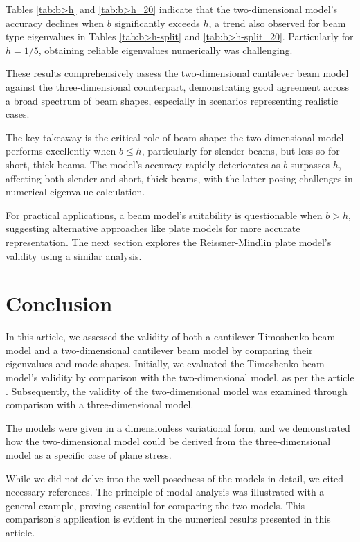 Tables \ref{tab:b>h} and \ref{tab:b>h_20} indicate that the two-dimensional model's accuracy declines when $b$ significantly exceeds $h$, a trend also observed for beam type eigenvalues in Tables \ref{tab:b>h-split} and \ref{tab:b>h-split_20}. Particularly for $h=1/5$, obtaining reliable eigenvalues numerically was challenging.

These results comprehensively assess the two-dimensional cantilever beam model against the three-dimensional counterpart, demonstrating good agreement across a broad spectrum of beam shapes, especially in scenarios representing realistic cases.

The key takeaway is the critical role of beam shape: the two-dimensional model performs excellently when $b \leq h$, particularly for slender beams, but less so for short, thick beams. The model's accuracy rapidly deteriorates as $b$ surpasses $h$, affecting both slender and short, thick beams, with the latter posing challenges in numerical eigenvalue calculation.

For practical applications, a beam model's suitability is questionable when $b > h$, suggesting alternative approaches like plate models for more accurate representation. The next section explores the Reissner-Mindlin plate model's validity using a similar analysis.

\section{Conclusion} \label{sec:conclusion}
In this article, we assessed the validity of both a cantilever Timoshenko beam model and a two-dimensional cantilever beam model by comparing their eigenvalues and mode shapes. Initially, we evaluated the Timoshenko beam model's validity by comparison with the two-dimensional model, as per the article \cite{LVV09}. Subsequently, the validity of the two-dimensional model was examined through comparison with a three-dimensional model.

The models were given in a dimensionless variational form, and we demonstrated how the two-dimensional model could be derived from the three-dimensional model as a specific case of plane stress.

While we did not delve into the well-posedness of the models in detail, we cited necessary references. The principle of modal analysis was illustrated with a general example, proving essential for comparing the two models. This comparison's application is evident in the numerical results presented in this article.

